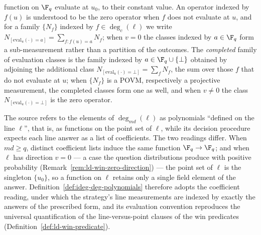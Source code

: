 \begin{definition}
	function on $\F_q$ evaluate at $u_0$, to their constant value. An
	operator indexed by $f(u)$ is understood to be the zero operator when
	$f$ does not evaluate at $u$, and for a family $\{N_f\}$ indexed by
	$f \in \deg_c(\ell)$ we write
	$N_{[\mathrm{eval}_u(\cdot)=a]} = \sum_{f \colon f(u) = a} N_f$; when
	$v = 0$ the classes indexed by $a \in \F_q$ form a sub-measurement
	rather than a partition of the outcomes. The \emph{completed} family of
	evaluation classes is the family indexed by $a \in \F_q \cup \{\bot\}$
	obtained by adjoining the additional class
	$N_{[\mathrm{eval}_u(\cdot)=\bot]} = \sum_{f} N_f$, the sum over those
	$f$ that do not evaluate at $u$; when $\{N_f\}$ is a POVM,
	respectively a projective measurement, the completed classes form one
	as well, and when $v \neq 0$ the class
	$N_{[\mathrm{eval}_u(\cdot)=\bot]}$ is the zero operator.
\end{definition}

\begin{remark}
	\label{rem:deg-line-representatives}
	The source refers to the elements of $\deg_{md}(\ell)$ as polynomials
	``defined on the line $\ell$'', that is, as functions on the point set
	of $\ell$, while its decision procedure expects each line answer as a
	list of coefficients. The two readings differ. When $md \geq q$,
	distinct coefficient lists induce the same function $\F_q \to \F_q$;
	and when $\ell$ has direction $v = 0$ --- a case the question
	distributions produce with positive probability
	(Remark~\ref{rem:ld-win-zero-direction}) --- the point set of $\ell$ is
	the singleton $\{u_0\}$, so a function on $\ell$ retains only a single
	field element of the answer. Definition~\ref{def:ideg-deg-polynomials}
	therefore adopts the coefficient reading, under which the strategy's
	line measurements are indexed by exactly the answers of the prescribed
	form, and its evaluation convention reproduces the universal
	quantification of the line-versus-point clauses of the win predicates
	(Definition~\ref{def:ld-win-predicate}).
\end{remark}

